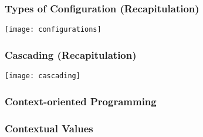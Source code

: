 \begin{frame}
	\frametitle{Types of Configuration (Recapitulation)}
	\begin{description}
	\end{description}
\end{frame}

\begin{frame}
	\hspace*{-1em}\texttt{[image: configurations]}
\end{frame}

\begin{frame}
	\frametitle{Cascading (Recapitulation)}
	\texttt{[image: cascading]}
\end{frame}

\begin{frame}
	\frametitle{Context-oriented Programming}
\end{frame}

\begin{frame}
	\frametitle{Contextual Values}
\end{frame}


